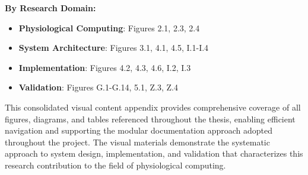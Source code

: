 \textbf{By Research Domain:}
\begin{itemize}
\item \textbf{Physiological Computing}: Figures 2.1, 2.3, 2.4
\item \textbf{System Architecture}: Figures 3.1, 4.1, 4.5, I.1-I.4
\item \textbf{Implementation}: Figures 4.2, 4.3, 4.6, I.2, I.3
\item \textbf{Validation}: Figures G.1-G.14, 5.1, Z.3, Z.4
\end{itemize}

This consolidated visual content appendix provides comprehensive coverage of all figures, diagrams, and tables referenced throughout the thesis, enabling efficient navigation and supporting the modular documentation approach adopted throughout the project. The visual materials demonstrate the systematic approach to system design, implementation, and validation that characterizes this research contribution to the field of physiological computing.
